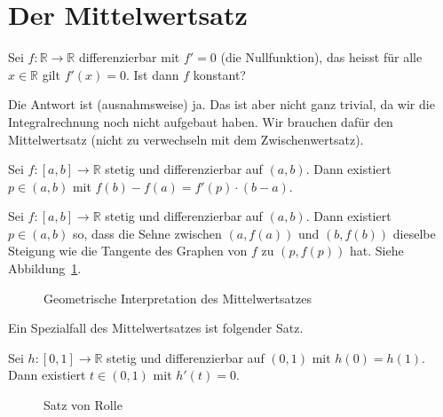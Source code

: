 \documentclass[../main.tex]{subfiles}
\begin{document}
\section{Der Mittelwertsatz}
\begin{question}
  Sei $f \colon \mathbb{R} \to \mathbb{R}$ 
  differenzierbar mit $f' = 0$ (die Nullfunktion),
  das heisst für alle $x \in \mathbb{R}$ gilt
  $f'(x) = 0$. Ist dann $f$ konstant?
\end{question}

Die Antwort ist (ausnahmsweise) ja.
Das ist aber nicht ganz trivial, da wir
die Integralrechnung noch nicht aufgebaut haben.
Wir brauchen dafür den Mittelwertsatz
(nicht zu verwechseln mit dem Zwischenwertsatz).

\begin{meanvalue}
  Sei $f \colon [a, b] \to \mathbb{R}$ 
  stetig und differenzierbar auf $(a, b)$.
  Dann existiert $p \in (a, b)$ mit $f(b) - f(a)
  = f'(p) \cdot (b-a)$.
\end{meanvalue}

\begin{geometric}
  Sei $ f \colon [a, b] \to \mathbb{R}$ stetig
  und differenzierbar auf $(a, b)$.
  Dann existiert $p \in (a, b)$ so, dass
  die Sehne zwischen $(a, f(a))$ und
  $(b, f(b))$ dieselbe Steigung
  wie die Tangente des Graphen von $f$ zu $
  (p, f(p))$ hat. Siehe Abbildung~\ref{fig:meanvalue}.
\end{geometric}

\begin{figure}[htb]
  \centering
  
  \caption{Geometrische Interpretation
  des Mittelwertsatzes}%
  \label{fig:meanvalue}
\end{figure}

Ein Spezialfall des Mittelwertsatzes ist folgender Satz.

\begin{rolle}
  Sei $h \colon [0, 1] \to \mathbb{R}$ stetig
  und differenzierbar auf $(0, 1)$ 
  mit $h(0) = h(1)$.
  Dann existiert $t \in (0, 1)$ 
  mit $h'(t) = 0$.
\end{rolle}

\begin{figure}[htb]
  \centering
  
  \caption{Satz von Rolle}%
  \label{fig:rolle}
\end{figure}
\end{document}
